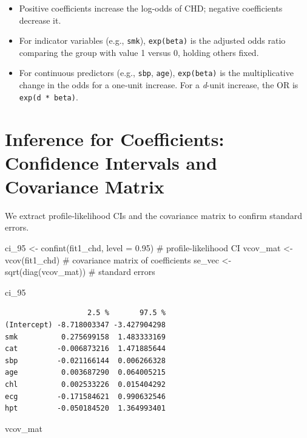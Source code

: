 \documentclass[
  letterpaper,
]{scrbook}
\newenvironment{Shaded}{\begin{snugshade}}{\end{snugshade}}
\newcommand{\AttributeTok}[1]{\textcolor[rgb]{0.40,0.45,0.13}{#1}}
\newcommand{\CommentTok}[1]{\textcolor[rgb]{0.37,0.37,0.37}{#1}}
\newcommand{\FloatTok}[1]{\textcolor[rgb]{0.68,0.00,0.00}{#1}}
\newcommand{\FunctionTok}[1]{\textcolor[rgb]{0.28,0.35,0.67}{#1}}
\newcommand{\NormalTok}[1]{\textcolor[rgb]{0.00,0.23,0.31}{#1}}
\newcommand{\OtherTok}[1]{\textcolor[rgb]{0.00,0.23,0.31}{#1}}
\providecommand{\tightlist}{%
  \setlength{\itemsep}{0pt}\setlength{\parskip}{0pt}}\usepackage{longtable,booktabs,array}
\begin{document}
\begin{itemize}
\tightlist
\item
  Positive coefficients increase the log-odds of CHD; negative
  coefficients decrease it.
\item
  For indicator variables (e.g., \texttt{smk}), \texttt{exp(beta)} is
  the adjusted odds ratio comparing the group with value 1 versus 0,
  holding others fixed.
\item
  For continuous predictors (e.g., \texttt{sbp}, \texttt{age}),
  \texttt{exp(beta)} is the multiplicative change in the odds for a
  one‑unit increase. For a \emph{d}-unit increase, the OR is
  \texttt{exp(d\ *\ beta)}.
\end{itemize}

\section{Inference for Coefficients: Confidence Intervals and Covariance
Matrix}\label{inference-for-coefficients-confidence-intervals-and-covariance-matrix}

We extract profile‑likelihood CIs and the covariance matrix to confirm
standard errors.

\begin{Shaded}
\begin{Highlighting}[]
\NormalTok{ci\_95 }\OtherTok{\textless{}{-}} \FunctionTok{confint}\NormalTok{(fit1\_chd, }\AttributeTok{level =} \FloatTok{0.95}\NormalTok{)     }\CommentTok{\# profile{-}likelihood CI}
\NormalTok{vcov\_mat }\OtherTok{\textless{}{-}} \FunctionTok{vcov}\NormalTok{(fit1\_chd)                    }\CommentTok{\# covariance matrix of coefficients}
\NormalTok{se\_vec   }\OtherTok{\textless{}{-}} \FunctionTok{sqrt}\NormalTok{(}\FunctionTok{diag}\NormalTok{(vcov\_mat))          }\CommentTok{\# standard errors}

\NormalTok{ci\_95}
\end{Highlighting}
\end{Shaded}

\begin{verbatim}
                   2.5 %       97.5 %
(Intercept) -8.718003347 -3.427904298
smk          0.275699158  1.483333169
cat         -0.006873216  1.471885644
sbp         -0.021166144  0.006266328
age          0.003687290  0.064005215
chl          0.002533226  0.015404292
ecg         -0.171584621  0.990632546
hpt         -0.050184520  1.364993401
\end{verbatim}

\begin{Shaded}
\begin{Highlighting}[]
\NormalTok{vcov\_mat}
\end{Highlighting}
\end{Shaded}
\end{document}
